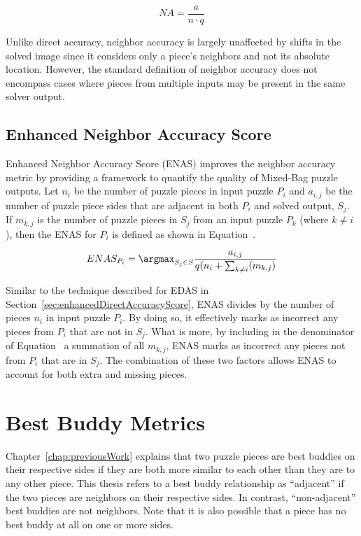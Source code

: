 \begin{equation} \label{eq:neighborAccuracy}
  NA = \frac{a}{n \cdot q}
\end{equation}

Unlike direct accuracy, neighbor accuracy is largely unaffected by shifts in the solved image since it considers only a piece's neighbors and not its absolute location.  However, the standard definition of neighbor accuracy does not encompass cases where pieces from multiple inputs may be present in the same solver output.  

\subsection{Enhanced Neighbor Accuracy Score}\label{sec:enhancedNeighborAccuracyScore}

Enhanced Neighbor Accuracy Score (ENAS) improves the neighbor accuracy metric by providing a framework to quantify the quality of Mixed-Bag puzzle outputs.   Let $n_i$ be the number of puzzle pieces in input puzzle $P_i$ and $a_{i,j}$ be the number of puzzle piece sides that are adjacent in both $P_i$ and solved output, $S_j$.  If $m_{k,j}$ is the number of puzzle pieces in $S_j$ from an input puzzle $P_k$ (where $k \ne i$), then the ENAS for $P_i$ is defined as shown in Equation~.

\begin{equation} \label{eq:enhancedNeighborAccuracyScore}
  ENAS_{P_i} = \argmax_{S_j \in S}\frac{a_{i,j}}{q (n_i + \sum_{k \ne i}(m_{k,j})}
\end{equation}

Similar to the technique described for EDAS in Section~\ref{sec:enhancedDirectAccuracyScore}, ENAS divides by the number of pieces $n_i$ in input puzzle $P_i$.  By doing so, it effectively marks as incorrect any pieces from $P_i$ that are not in $S_j$.  What is more, by including in the denominator of Equation~ a summation of all $m_{k,j}$, ENAS marks as incorrect any pieces not from $P_i$ that are in $S_j$.  The combination of these two factors allows ENAS to account for both extra and missing pieces.

\section{Best Buddy Metrics}\label{sec:bestBuddyMetrics}

Chapter~\ref{chap:previousWork} explains that two puzzle pieces are best buddies on their respective sides if they are both more similar to each other than they are to any other piece.  This thesis refers to a best buddy relationship as ``adjacent'' if the two pieces are neighbors on their respective sides.  In contrast, ``non-adjacent'' best buddies are not neighbors.  Note that it is also possible that a piece has no best buddy at all on one or more sides.

